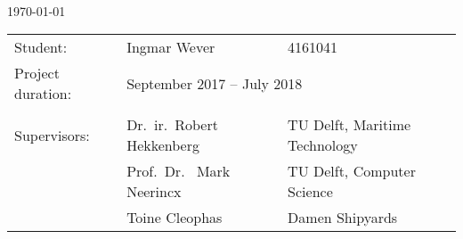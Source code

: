 {	%
	\begin{titlepage}
		\newpage
		\setcounter{page}{0}
		
		\centering
		\Large
		\vspace*{3cm}
		\doctitle\\
		\large
		\vspace{1cm}
		\today
		
		\vspace{7cm}
		\normalsize
		\begin{tabular}{lll}
			Student: & Ingmar Wever & 4161041 \\
			Project duration: & \multicolumn{2}{l}{September 2017 -- July 2018} \\
			& & \\
			Supervisors: & Dr.\ ir.\ Robert Hekkenberg & TU Delft, Maritime Technology \\
			& Prof.\ Dr. \ Mark Neerincx & TU Delft, Computer Science \\
			& Toine Cleophas & Damen Shipyards
		\end{tabular}

\end{titlepage}
		
}
	